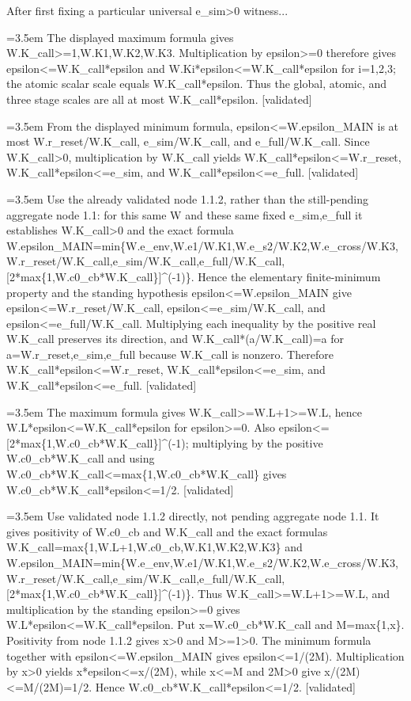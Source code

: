\documentclass{article}
\newcommand{\step}[1]{\par\noindent\hangindent=3.5em\hangafter=1%
  \makebox[3.5em][l]{\textbf{#1.}}}
\newcommand{\steptag}[1]{\hfill{\small\textsf{[#1]}}}
\begin{document}
\begin{proofbox}{After first fixing a particular universal e\_sim>0 witness...}
\step{1.3} The displayed maximum formula gives W.K\_call>=1,W.K1,W.K2,W.K3. Multiplication by epsilon>=0 therefore gives epsilon<=W.K\_call*epsilon and W.Ki*epsilon<=W.K\_call*epsilon for i=1,2,3; the atomic scalar scale equals W.K\_call*epsilon. Thus the global, atomic, and three stage scales are all at most W.K\_call*epsilon. \steptag{validated} \\[4pt]
\step{1.4} From the displayed minimum formula, epsilon<=W.epsilon\_MAIN is at most W.r\_reset/W.K\_call, e\_sim/W.K\_call, and e\_full/W.K\_call. Since W.K\_call>0, multiplication by W.K\_call yields W.K\_call*epsilon<=W.r\_reset, W.K\_call*epsilon<=e\_sim, and W.K\_call*epsilon<=e\_full. \steptag{validated} \\[6pt]
\step{1.4.1} Use the already validated node 1.1.2, rather than the still-pending aggregate node 1.1: for this same W and these same fixed e\_sim,e\_full it establishes W.K\_call>0 and the exact formula W.epsilon\_MAIN=min\{W.e\_env,W.e1/W.K1,W.e\_s2/W.K2,W.e\_cross/W.K3,W.r\_reset/W.K\_call,e\_sim/W.K\_call,e\_full/W.K\_call,[2*max\{1,W.c0\_cb*W.K\_call\}]\textasciicircum{}(-1)\}. Hence the elementary finite-minimum property and the standing hypothesis epsilon<=W.epsilon\_MAIN give epsilon<=W.r\_reset/W.K\_call, epsilon<=e\_sim/W.K\_call, and epsilon<=e\_full/W.K\_call. Multiplying each inequality by the positive real W.K\_call preserves its direction, and W.K\_call*(a/W.K\_call)=a for a=W.r\_reset,e\_sim,e\_full because W.K\_call is nonzero. Therefore W.K\_call*epsilon<=W.r\_reset, W.K\_call*epsilon<=e\_sim, and W.K\_call*epsilon<=e\_full. \steptag{validated} \\[4pt]
\step{1.5} The maximum formula gives W.K\_call>=W.L+1>=W.L, hence W.L*epsilon<=W.K\_call*epsilon for epsilon>=0. Also epsilon<=[2*max\{1,W.c0\_cb*W.K\_call\}]\textasciicircum{}(-1); multiplying by the positive W.c0\_cb*W.K\_call and using W.c0\_cb*W.K\_call<=max\{1,W.c0\_cb*W.K\_call\} gives W.c0\_cb*W.K\_call*epsilon<=1/2. \steptag{validated} \\[6pt]
\step{1.5.1} Use validated node 1.1.2 directly, not pending aggregate node 1.1. It gives positivity of W.c0\_cb and W.K\_call and the exact formulas W.K\_call=max\{1,W.L+1,W.c0\_cb,W.K1,W.K2,W.K3\} and W.epsilon\_MAIN=min\{W.e\_env,W.e1/W.K1,W.e\_s2/W.K2,W.e\_cross/W.K3,W.r\_reset/W.K\_call,e\_sim/W.K\_call,e\_full/W.K\_call,[2*max\{1,W.c0\_cb*W.K\_call\}]\textasciicircum{}(-1)\}. Thus W.K\_call>=W.L+1>=W.L, and multiplication by the standing epsilon>=0 gives W.L*epsilon<=W.K\_call*epsilon. Put x=W.c0\_cb*W.K\_call and M=max\{1,x\}. Positivity from node 1.1.2 gives x>0 and M>=1>0. The minimum formula together with epsilon<=W.epsilon\_MAIN gives epsilon<=1/(2M). Multiplication by x>0 yields x*epsilon<=x/(2M), while x<=M and 2M>0 give x/(2M)<=M/(2M)=1/2. Hence W.c0\_cb*W.K\_call*epsilon<=1/2. \steptag{validated} \\[4pt]
\end{proofbox}
\end{document}
